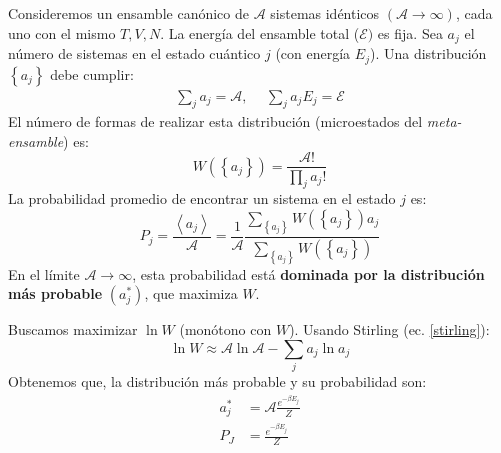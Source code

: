 \documentclass[]{article}
\numberwithin{equation}{section}
\newcommand{\0}{\textcolor{gray}{0}}
\begin{document}
Consideremos un ensamble canónico de \(\mathcal{A}\) sistemas idénticos \((\mathcal{A}\rightarrow\infty)\), cada uno con el mismo \(T, V, N\). La energía del ensamble total (\(\mathcal{E})\) es fija. Sea \(a_j\) el número de sistemas en el estado cuántico \(j\) (con energía \(E_j\)). Una distribución \(\left\{a_j\right\}\) debe cumplir:
\begin{equation}
	\begin{matrix}
		\sum_{j} a_j = \mathcal{A}, &~~\sum_{j}a_j E_j = \mathcal{E}
	\end{matrix}
\end{equation}
El número de formas de realizar esta distribución (microestados del \textit{meta-ensamble}) es:
\begin{equation}
	W\left(\left\{a_j\right\}\right) = \frac{\mathcal{A}!}{\prod_{j}a_{j}!}
\end{equation}
La probabilidad promedio de encontrar un sistema en el estado \(j\) es:
\begin{equation}
	P_j = \frac{\left\langle a_j\right\rangle }{\mathcal{A}} = \frac{1}{\mathcal{A}}\frac{\sum_{\left\{a_j\right\}} W(\left\{a_j\right\}) a_j}{\sum_{\left\{a_j\right\}} W(\left\{a_j\right\})}
\end{equation}
En el límite \(\mathcal{A}\rightarrow\infty\), esta probabilidad está \textbf{dominada por la distribución más probable} \((a^{*}_{j})\), que maximiza \(W\).

Buscamos maximizar \(\ln W\) (monótono con \(W \)). Usando Stirling (ec. \ref{stirling}):
\begin{equation}
	\ln W \approx \mathcal{A}\ln\mathcal{A} - \sum_{j} a_j \ln a_j
\end{equation}
Obtenemos que, la distribución más probable y su probabilidad son:
\begin{align}
	a^{*}_{j} &= \mathcal{A}\frac{e^{-\beta E_j}}{Z}\\
	P_J &= \frac{e^{-\beta E_j}}{Z}
\end{align}
\end{document}
